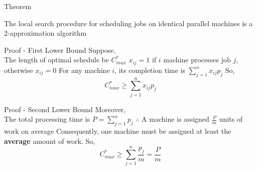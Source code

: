 \documentclass[aspectratio=169,xcolor=dvipsnames, t]{beamer}
\begin{document}

\begin{frame}{Theorem}
    \begin{theorem}
        The local search procedure for scheduling jobs on identical parallel machines is a 2-approximation algorithm
    \end{theorem}
\end{frame}

\begin{frame}{Proof - First Lower Bound}
    Suppose, \\
    The length of optimal schedule be $C_{max}^*$ \newline \newline \pause
    $x_{ij}=1$ if $i$ machine processes job $j$, otherwise $x_{ij}=0$ \newline \newline \pause
    For any machine $i$, its completion time is $\sum_{j=1}^{n} x_{ij}p_j$ \newline \newline \pause
    So,
    \begin{equation}\label{E1}
        C_{max}^* \ge \sum_{j=1}^{n} x_{ij}p_j
    \end{equation}
\end{frame}

\begin{frame}{Proof - Second Lower Bound}
    Moreover, \\
    The total processing time is $P=\sum_{j=1}^n p_j$ \newline \newline \pause
    $\therefore$ A machine is assigned $\frac{P}{m}$ units of work on average \newline \newline \pause
    Consequently, one machine must be assigned at least the \textbf{average} amount of work.
    So,
    \begin{equation}\label{E2}
        C_{max}^* \ge \sum_{j=1}^{n} \frac{p_j}{m} = \frac{P}{m}
    \end{equation}
\end{frame}
\end{document}
